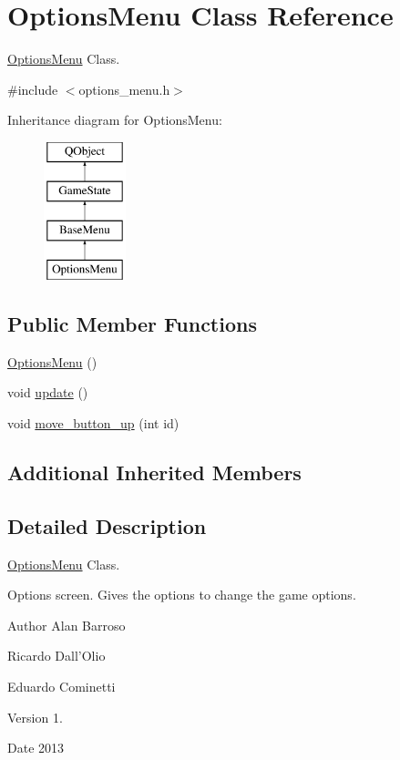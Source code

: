 \hypertarget{class_options_menu}{\section{Options\-Menu Class Reference}
\label{class_options_menu}
}


\hyperlink{class_options_menu}{Options\-Menu} Class.  




{\ttfamily \#include $<$options\-\_\-menu.\-h$>$}

Inheritance diagram for Options\-Menu\-:\begin{figure}[H]
\begin{center}
\leavevmode
\includegraphics[height=4.000000cm]{class_options_menu}
\end{center}
\end{figure}
\subsection*{Public Member Functions}
\begin{DoxyCompactItemize}
\item 
\hyperlink{class_options_menu_aa1164b1bc500cc1f53b176ab05b30fe2}{Options\-Menu} ()
\item 
void \hyperlink{class_options_menu_ad653e8ad74119e2fdac3fdcabcb8119f}{update} ()
\item 
void \hyperlink{class_options_menu_a149a8b7cfaa4185f6007bb0db18e81a4}{move\-\_\-button\-\_\-up} (int id)
\end{DoxyCompactItemize}
\subsection*{Additional Inherited Members}


\subsection{Detailed Description}
\hyperlink{class_options_menu}{Options\-Menu} Class. 

Options screen. Gives the options to change the game options. \begin{DoxyAuthor}{Author}
Alan Barroso 

Ricardo Dall'Olio 

Eduardo Cominetti 
\end{DoxyAuthor}
\begin{DoxyVersion}{Version}
1. 
\end{DoxyVersion}
\begin{DoxyDate}{Date}
2013 
\end{DoxyDate}


